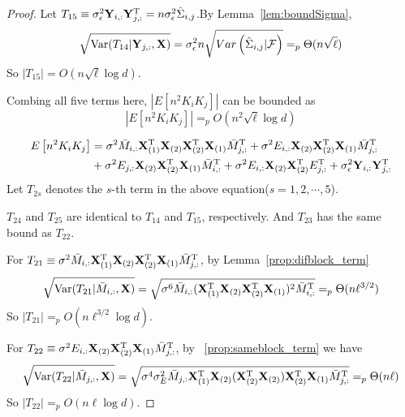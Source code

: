 \begin{proof}
Let $T_{15} \equiv \sigma^2_{\epsilon}\mathbf{Y}_{i,:}\mathbf{Y}^{\mathrm{T}}_{j,:} = n\sigma^2_{\epsilon} \hat{\Sigma}_{i,j}$.By Lemma~\ref{lem:boundSigma}, 
\begin{equation}
    \sqrt{\mathrm{Var}(T_{14}|\mathbf{Y}_{j,:}, \mathbf{X})}
    = \sigma^2_{\epsilon} n \sqrt{Var\left(\hat{\Sigma}_{i,j}|\mathcal{F} \right)} =_p \Theta(n \sqrt{\ell})
\end{equation}
So $|T_{15}| = O(n \sqrt{\ell}\log d)$.

Combing all five terms here, $\left|E\left[ n^2 K_i K_j \right]\right|$ can be bounded as
\begin{equation}
    \left|E\left[ n^2 K_i K_j \right]\right| =_p O(n^2 \sqrt{\ell} \log d)
\end{equation}


\begin{equation}
\begin{split}
    E\left[ n^2 K_i K_j\right] 
    &=  \sigma^2 \bar M_{i, :}\mathbf{X}_{(1)}^{\mathrm{T}}\mathbf{X}_{(2)}\mathbf{X}_{(2)}^{\mathrm{T}}\mathbf{X}_{(1)}\bar M^{\mathrm{T}}_{j, :}   + \sigma^2E_{i,:}\mathbf{X}_{(2)}\mathbf{X}^{\mathrm{T}}_{(2)}\mathbf{X}_{(1)}\bar M^{\mathrm{T}}_{j,:}  \\
    &+ \sigma^2E_{j,:}\mathbf{X}_{(2)}\mathbf{X}^{\mathrm{T}}_{(2)}\mathbf{X}_{(1)}\bar M^{\mathrm{T}}_{i,:}
    +\sigma^2 E_{i,:}\mathbf{X}_{(2)} \mathbf{X}_{(2)}^{\mathrm{T}} E^{\mathrm{T}}_{j,:} + \sigma^2_{\epsilon}\mathbf{Y}_{i,:}\mathbf{Y}^{\mathrm{T}}_{j,:}
\end{split}
\end{equation}
Let $T_{2s}$ denotes the $s$-th term in the above equation($s = 1,2,\cdots, 5$).

$T_{24}$ and $T_{25}$ are identical to $T_{14}$ and $T_{15}$, respectively. And $T_{23}$ has the same bound as $T_{22}$. 

For $T_{21} \equiv \sigma^2 \bar M_{i, :}\mathbf{X}_{(1)}^{\mathrm{T}}\mathbf{X}_{(2)}\mathbf{X}_{(2)}^{\mathrm{T}}\mathbf{X}_{(1)}\bar M^{\mathrm{T}}_{j, :}$, by Lemma~\ref{prop:difblock_term}
\begin{equation}
\begin{split}
     \sqrt{\mathrm{Var}(T_{21}| \bar M_{i,:},\mathbf{X}) }
    = \sqrt{\sigma^6 \bar M_{i, :}(\mathbf{X}_{(1)}^{\mathrm{T}}\mathbf{X}_{(2)}\mathbf{X}_{(2)}^{\mathrm{T}}\mathbf{X}_{(1)})^2\bar M^{\mathrm{T}}_{i, :}} =_p \Theta(n \ell^{3/2})
\end{split}
\end{equation}
So $|T_{21}| =_p O( n \ell^{3/2}\log d) $.

For $T_{22} \equiv \sigma^2E_{i,:}\mathbf{X}_{(2)}\mathbf{X}^{\mathrm{T}}_{(2)}\mathbf{X}_{(1)}\bar M^{\mathrm{T}}_{j,:}$, by  ~\ref{prop:sameblock_term} we have
\begin{equation}
\begin{split}
    \sqrt{\mathrm{Var}(T_{22}|\bar M_{j,:},\mathbf{X})}
    =\sqrt{\sigma^4 \sigma^2_E \bar M_{j, :}\mathbf{X}^{\mathrm{T}}_{(1)}\mathbf{X}_{(2)}(\mathbf{X}_{(2)}^{\mathrm{T}}\mathbf{X}_{(2)})\mathbf{X}^{\mathrm{T}}_{(2)}\mathbf{X}_{(1)} \bar M^{\mathrm{T}}_{j, :}}    
    =_p \Theta(n \ell)
\end{split}
\end{equation}
So $|T_{22}| =_p O( n \ell \log d) $.


\end{proof}

